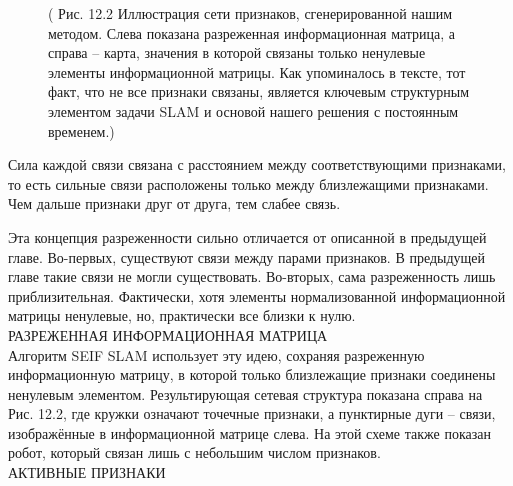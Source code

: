\documentclass[10pt,a4paper]{article}
\begin{document}
\begin{figure}[H]
	\caption{ ( Рис. 12.2 Иллюстрация сети признаков, сгенерированной нашим методом. Слева показана разреженная информационная матрица, а справа – карта, значения в которой связаны только ненулевые элементы информационной матрицы. Как упоминалось в тексте, тот факт, что не все признаки связаны, является ключевым структурным элементом задачи SLAM и основой нашего решения с постоянным временем.) }
	\label{fig:122orig}
\end{figure}

Сила каждой связи связана с расстоянием между соответствующими признаками, то есть сильные связи расположены только между близлежащими признаками. Чем дальше признаки друг от друга, тем слабее связь.

Эта концепция разреженности сильно отличается от описанной в предыдущей главе. Во-первых, существуют связи между парами признаков. В предыдущей главе такие связи не могли существовать. Во-вторых, сама разреженность лишь приблизительная. Фактически, хотя элементы нормализованной информационной матрицы ненулевые, но, практически все близки к нулю.\\

РАЗРЕЖЕННАЯ ИНФОРМАЦИОННАЯ МАТРИЦА\\

Алгоритм SEIF SLAM использует эту идею, сохраняя разреженную информационную матрицу, в которой только близлежащие признаки соединены ненулевым элементом.
Результирующая сетевая структура показана справа на Рис. 12.2, где кружки означают точечные признаки, а пунктирные дуги – связи, изображённые в информационной матрице слева. На этой схеме также показан робот, который связан лишь с небольшим числом признаков.\\

АКТИВНЫЕ ПРИЗНАКИ\\
\end{document}
